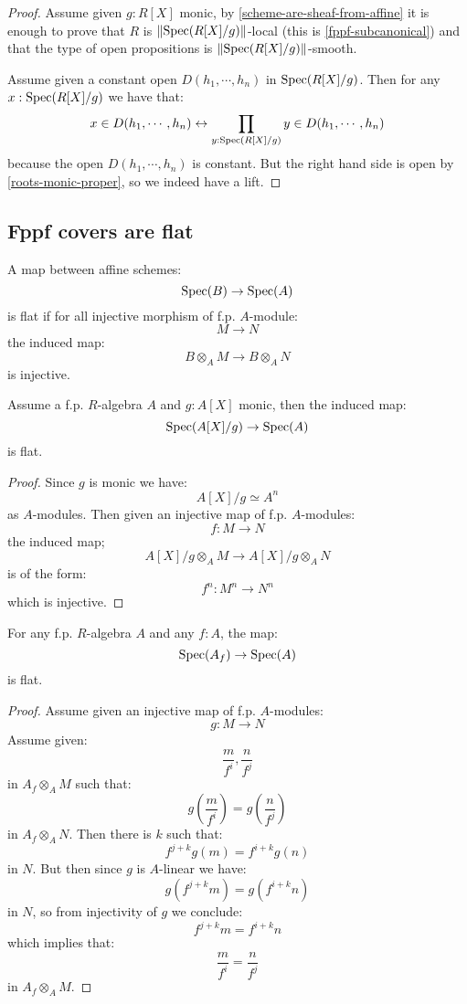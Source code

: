 \begin{proof}
Assume given $g:R[X]$ monic, by \cref{scheme-are-sheaf-from-affine} it is enough to prove that $R$ is $\lVert \operatorname{Spec}(R[X]/g) \rVert$-local (this is \cref{fppf-subcanonical}) and that the type of open propositions is $\lVert \operatorname{Spec}(R[X]/g) \rVert$-smooth. 

Assume given a constant open $D(h_1,\cdots,h_n)$ in $\operatorname{Spec}(R[X]/g)$. Then for any $x:\operatorname{Spec}(R[X]/g)$ we have that:
\[x\in D(h_1,\cdots,h_n) \leftrightarrow \prod_{y:\operatorname{Spec}(R[X]/g)} y\in D(h_1,\cdots,h_n)\]
because the open $D(h_1,\cdots,h_n)$ is constant. But the right hand side is open by \cref{roots-monic-proper}, so we indeed have a lift.
\end{proof}

\subsection{Fppf covers are flat}

\begin{definition}
A map between affine schemes:
\[\operatorname{Spec}(B)\to \operatorname{Spec}(A)\]
is flat if for all injective morphism of f.p. $A$-module: 
\[M\to N\]
the induced map:
\[B\otimes_A M \to B\otimes_A N\]
is injective.
\end{definition}

\begin{lemma}\label{root-monic-flat}
Assume a f.p. $R$-algebra $A$ and $g:A[X]$ monic, then the induced map:
\[\operatorname{Spec}(A[X]/g)\to \operatorname{Spec}(A)\]
is flat.
\end{lemma}

\begin{proof}
Since $g$ is monic we have:
\[A[X]/g\simeq A^n\]
as $A$-modules. Then given an injective map of f.p. $A$-modules:
\[f:M\to N\]
the induced map;
\[A[X]/g\otimes_AM \to A[X]/g\otimes_AN\]
is of the form:
\[f^n:M^n\to N^n\]
which is injective.
\end{proof}

\begin{lemma}\label{localisation-is-flat}
For any f.p. $R$-algebra $A$ and any $f:A$, the map:
\[\operatorname{Spec}(A_f)\to\operatorname{Spec}(A)\]
is flat.
\end{lemma}

\begin{proof}
Assume given an injective map of f.p. $A$-modules:
\[g:M\to N\]
Assume given:
\[\frac{m}{f^i},\frac{n}{f^j}\]
in $A_f\otimes_AM$ such that:
\[g(\frac{m}{f^i}) = g(\frac{n}{f^j})\]
in $A_f\otimes_AN$. Then there is $k$ such that:
\[f^{j+k}g(m) = f^{i+k}g(n)\]
in $N$. But then since $g$ is $A$-linear we have:
\[g(f^{j+k}m) = g(f^{i+k}n)\]
in $N$, so from injectivity of $g$ we conclude:
\[f^{j+k}m = f^{i+k}n\]
which implies that:
\[\frac{m}{f^i} = \frac{n}{f^j}\]
in $A_f\otimes_AM$.
\end{proof}

